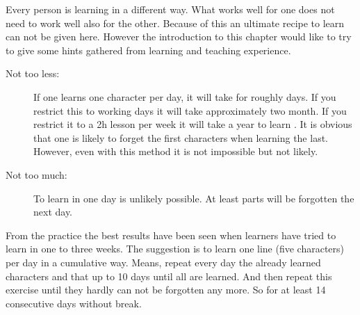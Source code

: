 
\normalsize

Every person is learning in a different way. What works well for one does not
need to work well also for the other. Because of this an ultimate recipe to
learn \textbf{\jtopic} can not be given here. However the introduction to this
chapter would like to try to give some  hints gathered from learning and
teaching experience.

\begin{description}

\item[Not too less:] If one learns one character per day, it will take for
        \textbf{\jtopic} roughly \jkanacount{} days. If you restrict this to
        working days it will take approximately two month. If you restrict it
        to a 2h lesson per week it will take a year to learn \textbf{\jtopic}.
        It is obvious that one is likely to forget the first characters when
        learning the last. However, even with this method it is not impossible
        but not likely.

\item[Not too much:]  To learn \textbf{\jtopic} in one day is unlikely
        possible. At least parts will be forgotten the next day.

\end{description}

From the practice the best results have been seen when learners have tried to
learn \textbf{\jtopic} in one to three weeks. The suggestion is to learn one
line (five characters) per day in a cumulative way. Means, repeat every day the
already learned characters and that up to 10 days until all are learned. And
then repeat this exercise until they hardly can not be forgotten any more. So
for at least 14 consecutive days without break.

